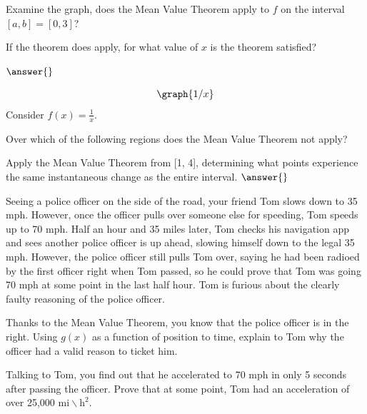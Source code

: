 \documentclass{ximera}
\begin{document}
\begin{question}
Examine the graph, does the Mean Value Theorem apply to $f$ on the interval $[a,b]=[0,3]$?

\begin{multipleChoice}
\end{multipleChoice}

If the theorem does apply, for what value of $x$ is the theorem satisfied?

$\answer{}$
\end{question}

\begin{question}
\[
\graph{1/x}
\]
Consider $f(x) = \frac{1}{x}$.

Over which of the following regions does the Mean Value Theorem not apply?

\begin{selectAll}
\choice{$[1,2]$}
\choice{$(0,4]$}
\choice[correct]{$[-1,1]$}
\choice[correct]{$[0,2]$}
\choice{$[-5,0)$}
\end{selectAll}

Apply the Mean Value Theorem from [1, 4], determining what points experience the same instantaneous change as the entire interval.
$\answer{}$
\end{question}

\begin{question}
Seeing a police officer on the side of the road, your friend Tom slows down to 35 mph. However, once the officer pulls over someone else for speeding, Tom speeds up to 70 mph. Half an hour and 35 miles later, Tom checks his navigation app and sees another police officer is up ahead, slowing himself down to the legal 35 mph. However, the police officer still pulls Tom over, saying he had been radioed by the first officer right when Tom passed, so he could prove that Tom was going 70 mph at some point in the last half hour. Tom is furious about the clearly faulty reasoning of the police officer.

Thanks to the Mean Value Theorem, you know that the police officer is in the right. Using $g(x)$ as a function of position to time, explain to Tom why the officer had a valid reason to ticket him.

\begin{freeResponse}
\end{freeResponse}

Talking to Tom, you find out that he accelerated to 70 mph in only 5 seconds after passing the officer. Prove that at some point, Tom had an acceleration of over 25,000 $\text{mi} \backslash \text{h}^2$.

\begin{freeResponse}
\end{freeResponse}
\end{question}
\end{document}

